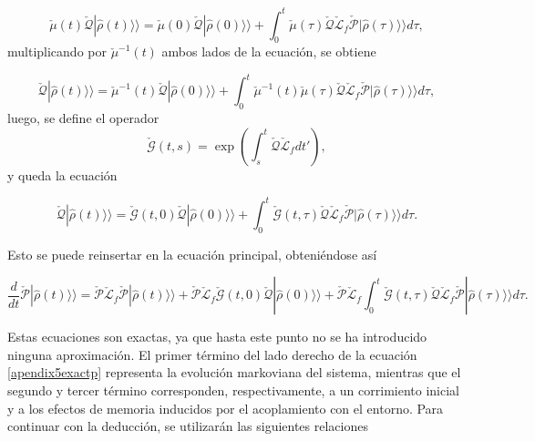 \begin{appendixs}
\begin{equation*}
    \check{\mu}(t)\check{\mathcal{Q}}|\hat{\rho}(t)\rangle \rangle  = \check{\mu}(0)\check{\mathcal{Q}}|\hat{\rho}(0)\rangle \rangle  + \int_{0}^{t}\check{\mu}(\tau)\check{\mathcal{Q}}\check{\mathcal{L}}_{f} \check{\mathcal{P}}|\hat{\rho}(\tau)\rangle \rangle d\tau,   
\end{equation*}
multiplicando por $\check{\mu}^{-1}(t)$ ambos lados de la ecuación, se obtiene

\begin{equation*}
    \check{\mathcal{Q}}|\hat{\rho}(t)\rangle \rangle  = \check{\mu}^{-1}(t)\check{\mathcal{Q}}|\hat{\rho}(0)\rangle \rangle  + \int_{0}^{t}\check{\mu}^{-1}(t)\check{\mu}(\tau)\check{\mathcal{Q}}\check{\mathcal{L}}_{f} \check{\mathcal{P}}|\hat{\rho}(\tau)\rangle \rangle d\tau,    
\end{equation*}
luego, se define el operador 
\begin{equation*}
    \check{\mathcal{G}}(t,s) = \exp\left(  \int_{s}^{t}\check{\mathcal{Q}}\check{\mathcal{L}}_{f}dt' \right),
\end{equation*}
y queda la ecuación 

\begin{equation*}
    \check{\mathcal{Q}}|\hat{\rho}(t)\rangle \rangle = \check{\mathcal{G}}(t,0)\check{\mathcal{Q}}|\hat{\rho}(0)\rangle \rangle  + \int_{0}^{t}\check{\mathcal{G}}(t,\tau)\check{\mathcal{Q}}\check{\mathcal{L}}_{f} \check{\mathcal{P}}|\hat{\rho}(\tau)\rangle \rangle d\tau.    
\end{equation*}

Esto se puede reinsertar en la ecuación principal, obteniéndose así

\begin{equation}
    \frac{d}{dt}\check{\mathcal{P}}|\hat{\rho}(t)\rangle \rangle  = \check{\mathcal{P}}\check{\mathcal{L}}_{f}\check{\mathcal{P}}|\hat{\rho}(t)\rangle \rangle  + \check{\mathcal{P}}\check{\mathcal{L}}_{f}\check{\mathcal{G}}(t,0)\check{\mathcal{Q}}|\hat{\rho}(0)\rangle \rangle  + \check{\mathcal{P}}\check{\mathcal{L}}_{f}\int_{0}^{t}\check{\mathcal{G}}(t,\tau)\check{\mathcal{Q}}\check{\mathcal{L}}_{f} \check{\mathcal{P}}|\hat{\rho}(\tau)\rangle \rangle d\tau.    
    \label{apendix5exactp}
\end{equation}

Estas ecuaciones son exactas, ya que hasta este punto no se ha introducido ninguna aproximación. El primer término del lado derecho de la ecuación \ref{apendix5exactp} representa la evolución markoviana del sistema, mientras que el segundo y tercer término corresponden, respectivamente, a un corrimiento inicial y a los efectos de memoria inducidos por el acoplamiento con el entorno. Para continuar con la deducción, se utilizarán las siguientes relaciones


\end{appendixs}
